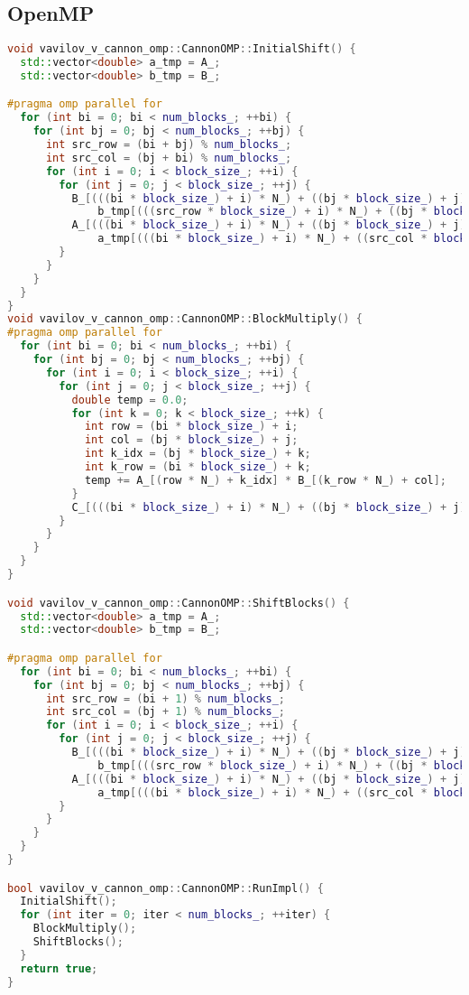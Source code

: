 \documentclass[a4paper,12pt]{article}
\begin{document}
\subsection{OpenMP}
\begin{lstlisting}[language=C++]
void vavilov_v_cannon_omp::CannonOMP::InitialShift() {
  std::vector<double> a_tmp = A_;
  std::vector<double> b_tmp = B_;

#pragma omp parallel for
  for (int bi = 0; bi < num_blocks_; ++bi) {
    for (int bj = 0; bj < num_blocks_; ++bj) {
      int src_row = (bi + bj) % num_blocks_;
      int src_col = (bj + bi) % num_blocks_;
      for (int i = 0; i < block_size_; ++i) {
        for (int j = 0; j < block_size_; ++j) {
          B_[(((bi * block_size_) + i) * N_) + ((bj * block_size_) + j)] =
              b_tmp[(((src_row * block_size_) + i) * N_) + ((bj * block_size_) + j)];
          A_[(((bi * block_size_) + i) * N_) + ((bj * block_size_) + j)] =
              a_tmp[(((bi * block_size_) + i) * N_) + ((src_col * block_size_) + j)];
        }
      }
    }
  }
}
void vavilov_v_cannon_omp::CannonOMP::BlockMultiply() {
#pragma omp parallel for
  for (int bi = 0; bi < num_blocks_; ++bi) {
    for (int bj = 0; bj < num_blocks_; ++bj) {
      for (int i = 0; i < block_size_; ++i) {
        for (int j = 0; j < block_size_; ++j) {
          double temp = 0.0;
          for (int k = 0; k < block_size_; ++k) {
            int row = (bi * block_size_) + i;
            int col = (bj * block_size_) + j;
            int k_idx = (bj * block_size_) + k;
            int k_row = (bi * block_size_) + k;
            temp += A_[(row * N_) + k_idx] * B_[(k_row * N_) + col];
          }
          C_[(((bi * block_size_) + i) * N_) + ((bj * block_size_) + j)] += temp;
        }
      }
    }
  }
}

void vavilov_v_cannon_omp::CannonOMP::ShiftBlocks() {
  std::vector<double> a_tmp = A_;
  std::vector<double> b_tmp = B_;

#pragma omp parallel for
  for (int bi = 0; bi < num_blocks_; ++bi) {
    for (int bj = 0; bj < num_blocks_; ++bj) {
      int src_row = (bi + 1) % num_blocks_;
      int src_col = (bj + 1) % num_blocks_;
      for (int i = 0; i < block_size_; ++i) {
        for (int j = 0; j < block_size_; ++j) {
          B_[(((bi * block_size_) + i) * N_) + ((bj * block_size_) + j)] =
              b_tmp[(((src_row * block_size_) + i) * N_) + ((bj * block_size_) + j)];
          A_[(((bi * block_size_) + i) * N_) + ((bj * block_size_) + j)] =
              a_tmp[(((bi * block_size_) + i) * N_) + ((src_col * block_size_) + j)];
        }
      }
    }
  }
}

bool vavilov_v_cannon_omp::CannonOMP::RunImpl() {
  InitialShift();
  for (int iter = 0; iter < num_blocks_; ++iter) {
    BlockMultiply();
    ShiftBlocks();
  }
  return true;
}

\end{lstlisting}
\end{document}
